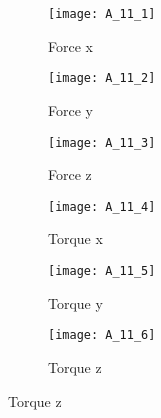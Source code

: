 \begin{figure}[H]
  \caption{Step function contact force} 
  \label{fig:appendix step contact} 
  \begin{subfigure}[t]{0.5\textwidth}
    \centering
    \texttt{[image: A\_11\_1]} 
    \caption{Force x}
  \end{subfigure}
  \begin{subfigure}[t]{0.5\textwidth}
    \centering
    \texttt{[image: A\_11\_2]}
    \caption{Force y}
  \end{subfigure}
  \begin{subfigure}[t]{0.5\textwidth}
    \centering
    \texttt{[image: A\_11\_3]}
    \caption{Force z}
  \end{subfigure}
  \begin{subfigure}[t]{0.5\textwidth}
    \centering
    \texttt{[image: A\_11\_4]}
    \caption{Torque x}
  \end{subfigure}
  \begin{subfigure}[t]{0.5\textwidth}
    \centering
    \texttt{[image: A\_11\_5]}
    \caption{Torque y}
  \end{subfigure}
  \begin{subfigure}[t]{0.5\textwidth}
    \centering
    \texttt{[image: A\_11\_6]}
    \caption{Torque z}
  \end{subfigure}
\end{figure}
